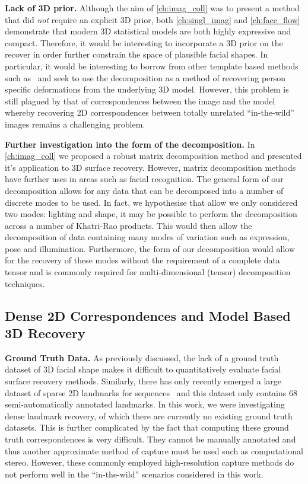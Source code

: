\textbf{Lack of 3D prior.} Although the aim of \cref{ch:imag_coll} was to 
present a method that did \textit{not} require an explicit 3D prior, both
\cref{ch:singl_imag} and \cref{ch:face_flow} demonstrate that modern 3D statistical
models are both highly expressive and compact. Therefore, it would be
interesting to incorporate a 3D prior on the recover in order further constrain
the space of plausible facial shapes. In particular, it would be interesting
to borrow from other template based methods 
such as~\cite{kemelmacher2011facereconstruction} and seek to use the decomposition
as a method of recovering person specific deformations from the underlying
3D model. However, this problem is still plagued by that of correspondences
between the image and the model whereby recovering 2D correspondences between
totally unrelated ``in-the-wild'' images remains a challenging problem.

\textbf{Further investigation into the form of the decomposition.}
In \cref{ch:imag_coll} we proposed a robust matrix decomposition method and 
presented it's application to 3D surface recovery. However, matrix decomposition
methods have further uses in areas such as facial recognition. The general
form of our decomposition allows for any data that can be decomposed into a number
of discrete modes to be used. In fact, we hypothesise that allow we only
considered two modes: lighting and shape, it may be possible to perform
the decomposition across a number of Khatri-Rao products. This would then allow
the decomposition of data containing many modes of variation such as expression,
pose and illumination. Furthermore, the form of our decomposition would
allow for the recovery of these modes without the requirement of a complete
data tensor and is commonly required for multi-dimensional (tensor) decomposition
techniques.
\subsection{Dense 2D Correspondences and Model Based 3D Recovery}
\textbf{Ground Truth Data.} As previously discussed, the lack of a ground
truth dataset of 3D facial shape makes it difficult to quantitatively evaluate
facial surface recovery methods. Similarly, there has only recently emerged
a large dataset of sparse 2D landmarks for sequences~\cite{shen2015first} and
this dataset only contains 68 semi-automatically annotated landmarks. In this
work, we were investigating dense landmark recovery, of which there are 
currently no existing ground truth datasets. This is further complicated by
the fact that computing these ground truth correspondences is very difficult.
They cannot be manually annotated and thus another approximate method of
capture must be used such as computational stereo. However, these commonly
employed high-resolution capture methods do not perform well in the 
``in-the-wild'' scenarios considered in this work.

